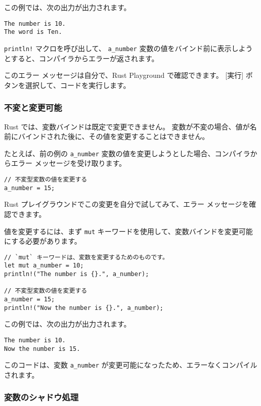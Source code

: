 この例では、次の出力が出力されます。

\begin{lstlisting}[numbers=none]
The number is 10.
The word is Ten.
\end{lstlisting}

\texttt{println!} マクロを呼び出して、 \texttt{a\_number} 変数の値をバインド前に表示しようとすると、コンパイラからエラーが返されます。

このエラー メッセージは自分で、Rust Playground で確認できます。 [実行] ボタンを選択して、コードを実行します。

\subsubsection{不変と変更可能}

Rust では、変数バインドは既定で変更できません。 変数が不変の場合、値が名前にバインドされた後に、その値を変更することはできません。

たとえば、前の例の \texttt{a\_number} 変数の値を変更しようとした場合、コンパイラからエラー メッセージを受け取ります。


\begin{lstlisting}[numbers=none]
// 不変型変数の値を変更する
a_number = 15;
\end{lstlisting}

Rust プレイグラウンドでこの変更を自分で試してみて、エラー メッセージを確認できます。

値を変更するには、まず \texttt{mut} キーワードを使用して、変数バインドを変更可能にする必要があります。

\begin{lstlisting}[numbers=none]
// `mut` キーワードは、変数を変更するためのものです。
let mut a_number = 10; 
println!("The number is {}.", a_number);

// 不変型変数の値を変更する
a_number = 15;
println!("Now the number is {}.", a_number);
\end{lstlisting}

この例では、次の出力が出力されます。

\begin{lstlisting}[numbers=none]
The number is 10.
Now the number is 15.
\end{lstlisting}

このコードは、変数 \texttt{a\_number} が変更可能になったため、エラーなくコンパイルされます。

\subsubsection{変数のシャドウ処理}


